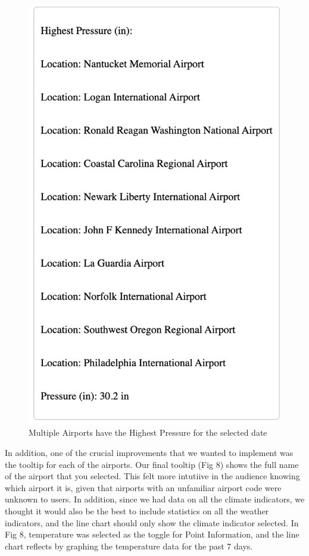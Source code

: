 \documentclass[9pt,twocolumn,twoside]{opticajnl}
\begin{document}
\begin{figure}
    \includegraphics[scale=0.5]{images/img8.png}
    \caption{Multiple Airports have the Highest Pressure for the selected date}
\end{figure}

In addition, one of the crucial improvements that we wanted to implement was the tooltip for each of the airports. Our final tooltip (Fig 8) shows the full name of the airport that you selected. This felt more intutiive in the audience knowing which airport it is, given that airports with an unfamiliar airport code were unknown to users. In addition, since we had data on all the climate indicators, we thought it would also be the best to include statistics on all the weather indicators, and the line chart should only show the climate indicator selected. In Fig 8, temperature was selected as the toggle for Point Information, and the line chart reflects by graphing the temperature data for the past 7 days.
\end{document}
